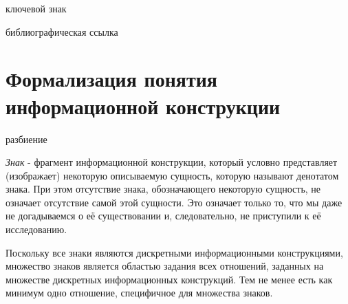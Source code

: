 \begin{SCn}
    \begin{scnrelfromlist}{ключевой знак}
    \end{scnrelfromlist}

    \bigskip

    \begin{scnrelfromlist}{библиографическая ссылка}
    \end{scnrelfromlist}

\end{SCn}



\section{Формализация понятия информационной конструкции}
\label{section_information_construction_formalization}

\begin{SCn}

    \begin{scnrelfromset}{разбиение}
    \end{scnrelfromset}

\end{SCn}

\textit{Знак} - фрагмент информационной конструкции, который условно представляет (изображает) некоторую описываемую сущность, которую называют денотатом знака.
При этом отсутствие знака, обозначающего некоторую сущность, не означает отсутствие самой этой сущности.
Это означает только то, что мы даже не догадываемся о её существовании и, следовательно, не приступили к её исследованию.

Поскольку все знаки являются дискретными информационными конструкциями, множество знаков является областью задания всех отношений, заданных на множестве дискретных информационных конструкций.
Тем не менее есть как минимум одно отношение, специфичное для множества знаков.

